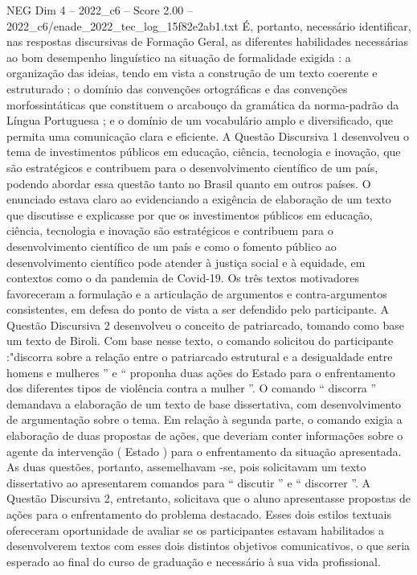 \begin{textsample}{NEG Dim 4 – 2022\_c6 – Score 2.00 – 2022\_c6/enade\_2022\_tec\_log\_15f82e2ab1.txt}
É, portanto, necessário identificar, nas respostas discursivas de Formação Geral, as diferentes habilidades necessárias ao bom desempenho linguístico na situação de formalidade exigida : a organização das ideias, tendo em vista a construção de um texto coerente e estruturado ; o domínio das convenções ortográficas e das convenções morfossintáticas que constituem o arcabouço da gramática da norma-padrão da Língua Portuguesa ; e o domínio de um vocabulário amplo e diversificado, que permita uma comunicação clara e eficiente.
A Questão Discursiva 1 desenvolveu o tema de investimentos públicos em educação, ciência, tecnologia e inovação, que são estratégicos e contribuem para o desenvolvimento científico de um país, podendo abordar essa questão tanto no Brasil quanto em outros países.
O enunciado estava claro ao evidenciando a exigência de elaboração de um texto que discutisse e explicasse por que os investimentos públicos em educação, ciência, tecnologia e inovação são estratégicos e contribuem para o desenvolvimento científico de um país e como o fomento público ao desenvolvimento científico pode atender à justiça social e à equidade, em contextos como o da pandemia de Covid-19.
Os três textos motivadores favoreceram a formulação e a articulação de argumentos e contra-argumentos consistentes, em defesa do ponto de vista a ser defendido pelo participante.
A Questão Discursiva 2 desenvolveu o conceito de patriarcado, tomando como base um texto de Biroli.
Com base nesse texto, o comando solicitou do participante :"discorra sobre a relação entre o patriarcado estrutural e a desigualdade entre homens e mulheres ” e “ proponha duas ações do Estado para o enfrentamento dos diferentes tipos de violência contra a mulher ”.
O comando “ discorra ” demandava a elaboração de um texto de base dissertativa, com desenvolvimento de argumentação sobre o tema.
Em relação à segunda parte, o comando exigia a elaboração de duas propostas de ações, que deveriam conter informações sobre o agente da intervenção ( Estado ) para o enfrentamento da situação apresentada.
As duas questões, portanto, assemelhavam -se, pois solicitavam um texto dissertativo ao apresentarem comandos para “ discutir ” e “ discorrer ”.
A Questão Discursiva 2, entretanto, solicitava que o aluno apresentasse propostas de ações para o enfrentamento do problema destacado.
Esses dois estilos textuais ofereceram oportunidade de avaliar se os participantes estavam habilitados a desenvolverem textos com esses dois distintos objetivos comunicativos, o que seria esperado ao final do curso de graduação e necessário à sua vida profissional.

\end{textsample}

